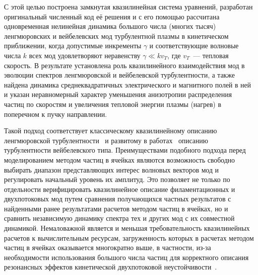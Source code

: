 С этой целью построена замкнутая квазилинейная система уравнений, разработан оригинальный численный код её решения и с его помощью рассчитана одновременная нелинейная динамика большого числа (многих тысяч) ленгмюровских и вейбелевских мод турбулентной плазмы в кинетическом приближении, когда допустимые инкременты $\gamma$ и соответствующие волновые числа $k$ всех мод удовлетворяют неравенству $\gamma\ll kv_T$, где $v_T$~--- тепловая скорость. В результате установлена роль квазилинейного взаимодействия мод в эволюции спектров ленгмюровской и вейбелевской турбулентности, а также найдена динамика среднеквадратичных электрического и магнитного полей в ней и указан неравномерный характер уменьшения анизотропии распределения частиц по скоростям и увеличения тепловой энергии плазмы (нагрев) в поперечном к пучку направлении. 

Такой подход соответствует классическому квазилинейному описанию ленгмюровской турбулентности~\cite{VedenovRyutov1975,Appert1976} и развитому в работах~\cite{Kuznetsov2022,Kuznetsov2023} описанию турбулентности вейбелевского типа. Преимуществами подобного подхода перед моделированием методом частиц в ячейках являются возможность свободно выбирать диапазон представляющих интерес волновых векторов мод и регулировать начальный уровень их амплитуд. Это позволяет не только по отдельности верифицировать квазилинейное описание филаментационных и двухпотоковых мод путем сравнения получающихся частных результатов с найденными ранее результатами расчетов методом частиц в ячейках, но и сравнить независимую динамику спектра тех и других мод с их совместной динамикой. Немаловажной является и меньшая требовательность квазилинейных расчетов к вычислительным ресурсам, загруженность которых в расчетах методом частиц в ячейках оказывается многократно выше, в частности, из-за необходимости использования большого числа частиц  для корректного описания резонансных эффектов кинетической двухпотоковой неустойчивости~\cite{Lotov2015}.  

